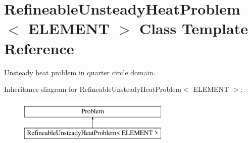 \hypertarget{classRefineableUnsteadyHeatProblem}{}\section{Refineable\+Unsteady\+Heat\+Problem$<$ E\+L\+E\+M\+E\+NT $>$ Class Template Reference}
\label{classRefineableUnsteadyHeatProblem}


Unsteady heat problem in quarter circle domain.  


Inheritance diagram for Refineable\+Unsteady\+Heat\+Problem$<$ E\+L\+E\+M\+E\+NT $>$\+:\begin{figure}[H]
\begin{center}
\leavevmode
\includegraphics[height=2.000000cm]{classRefineableUnsteadyHeatProblem}
\end{center}
\end{figure}
